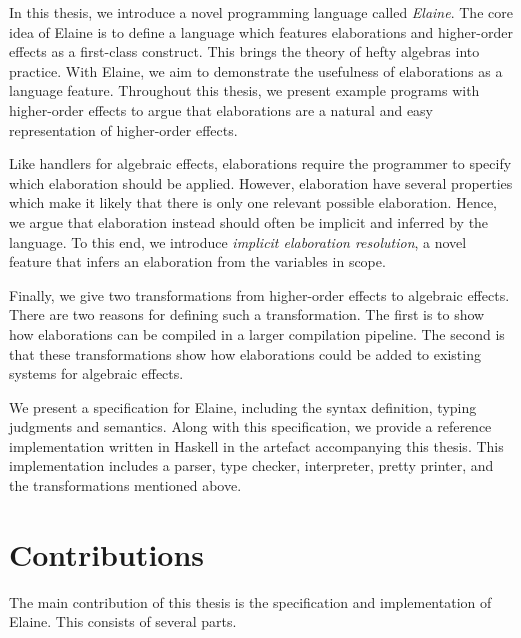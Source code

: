 In this thesis, we introduce a novel programming language called \emph{Elaine}. The core idea of Elaine is to define a language which features elaborations and higher-order effects as a first-class construct. This brings the theory of hefty algebras into practice. With Elaine, we aim to demonstrate the usefulness of elaborations as a language feature. Throughout this thesis, we present example programs with higher-order effects to argue that elaborations are a natural and easy representation of higher-order effects.

Like handlers for algebraic effects, elaborations require the programmer to specify which elaboration should be applied. However, elaboration have several properties which make it likely that there is only one relevant possible elaboration. Hence, we argue that elaboration instead should often be implicit and inferred by the language. To this end, we introduce \emph{implicit elaboration resolution}, a novel feature that infers an elaboration from the variables in scope.

Finally, we give two transformations from higher-order effects to algebraic effects. There are two reasons for defining such a transformation. The first is to show how elaborations can be compiled in a larger compilation pipeline. The second is that these transformations show how elaborations could be added to existing systems for algebraic effects.

We present a specification for Elaine, including the syntax definition, typing judgments and semantics. Along with this specification, we provide a reference implementation written in Haskell in the artefact accompanying this thesis. This implementation includes a parser, type checker, interpreter, pretty printer, and the transformations mentioned above.

\section{Contributions}

The main contribution of this thesis is the specification and implementation of Elaine. This consists of several parts.

